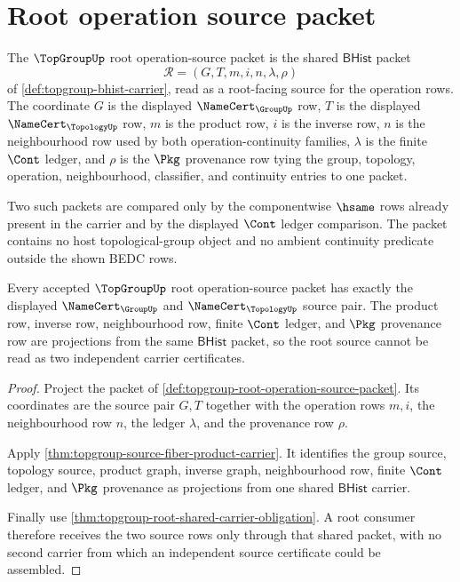 \section{Root operation source packet}
\label{sec:topgroup-root-operation-source-packet}

\begin{definition}
\label{def:topgroup-root-operation-source-packet}
The $\TopGroupUp$ root operation-source packet is the shared
$\mathsf{BHist}$ packet
$$
\mathcal R=(G,T,m,i,n,\lambda,\rho)
$$
of \autoref{def:topgroup-bhist-carrier}, read as a root-facing source for the
operation rows. The coordinate $G$ is the displayed
$\NameCert_{\GroupUp}$ row, $T$ is the displayed
$\NameCert_{\TopologyUp}$ row, $m$ is the product row, $i$ is the inverse row,
$n$ is the neighbourhood row used by both operation-continuity families,
$\lambda$ is the finite $\Cont$ ledger, and $\rho$ is the $\Pkg$ provenance
row tying the group, topology, operation, neighbourhood, classifier, and
continuity entries to one packet.

Two such packets are compared only by the componentwise $\hsame$ rows already
present in the carrier and by the displayed $\Cont$ ledger comparison. The
packet contains no host topological-group object and no ambient continuity
predicate outside the shown BEDC rows.
\end{definition}

\begin{theorem}
\label{thm:topgroup-root-source-pair-exactness}
Every accepted $\TopGroupUp$ root operation-source packet has exactly the
displayed $\NameCert_{\GroupUp}$ and $\NameCert_{\TopologyUp}$ source pair.
The product row, inverse row, neighbourhood row, finite $\Cont$ ledger, and
$\Pkg$ provenance row are projections from the same $\mathsf{BHist}$ packet,
so the root source cannot be read as two independent carrier certificates.
\end{theorem}
\begin{proof}
Project the packet of \autoref{def:topgroup-root-operation-source-packet}.
Its coordinates are the source pair $G,T$ together with the operation rows
$m,i$, the neighbourhood row $n$, the ledger $\lambda$, and the provenance row
$\rho$.

Apply \autoref{thm:topgroup-source-fiber-product-carrier}. It identifies the
group source, topology source, product graph, inverse graph, neighbourhood
row, finite $\Cont$ ledger, and $\Pkg$ provenance as projections from one
shared $\mathsf{BHist}$ carrier.

Finally use \autoref{thm:topgroup-root-shared-carrier-obligation}. A root
consumer therefore receives the two source rows only through that shared
packet, with no second carrier from which an independent source certificate
could be assembled.
\end{proof}

